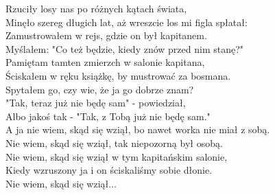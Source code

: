 Rzuciły losy nas po różnych kątach świata, \\
Minęło szereg długich lat, aż wreszcie los mi figla spłatał: \\
Zamustrowałem w rejs, gdzie on był kapitanem. \\
Myślałem: "Co też będzie, kiedy znów przed nim stanę?" \\

Pamiętam tamten zmierzch w salonie kapitana, \\
Ściskałem w ręku książkę, by mustrować za bosmana. \\
Spytałem go, czy wie, że ja go dobrze znam? \\
"Tak, teraz już nie będę sam" - powiedział, \\
Albo jakoś tak - "Tak, z Tobą już nie będę sam." \\

A ja nie wiem, skąd się wziął, bo nawet worka nie miał z sobą. \\
Nie wiem, skąd się wziął, tak niepozorną był osobą. \\
Nie wiem, skąd się wziął w tym kapitańskim salonie, \\
Kiedy wzruszony ja i on ściskaliśmy sobie dłonie. \\

Nie wiem, skąd się wziął... \\
